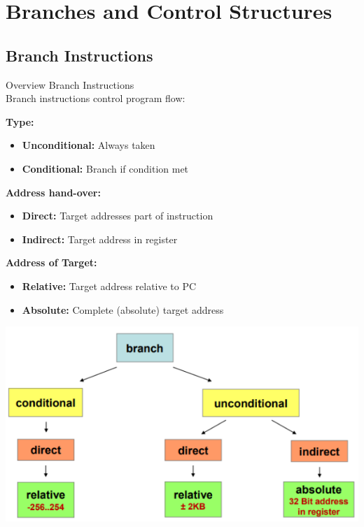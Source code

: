 \section{Branches and Control Structures}

\subsection{Branch Instructions}

\begin{concept}{Overview Branch Instructions}\\
Branch instructions control program flow:

\textcolor{darkcorn}{\textbf{Type:}}
\begin{itemize}
  \item \textbf{Unconditional:} Always taken
  \item \textbf{Conditional:} Branch if condition met
\end{itemize}

\textcolor{darktangerine}{\textbf{Address hand-over:}}
\begin{itemize}
  \item \textbf{Direct:} Target addresses part of instruction
  \item \textbf{Indirect:} Target address in register
\end{itemize}

\textcolor{darkfrog}{\textbf{Address of Target:}}
\begin{itemize}
  \item \textbf{Relative:} Target address relative to PC
  \item \textbf{Absolute:} Complete (absolute) target address
\end{itemize}

\includegraphics[width=\linewidth]{images/overview_branches.png}


\end{concept}
